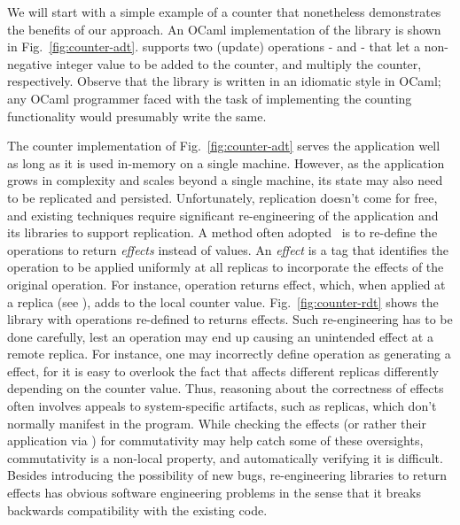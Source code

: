 We will start with a simple example of a counter that nonetheless
demonstrates the benefits of our approach. An OCaml implementation of
the  library is shown in Fig.~\ref{fig:counter-adt}.
 supports two (update) operations -  and  -
that let a non-negative integer value to be added to the counter, and
multiply the counter, respectively. Observe that the library is
written in an idiomatic style in OCaml; any OCaml programmer faced
with the task of implementing the counting functionality would
presumably write the same.

The counter implementation of Fig.~\ref{fig:counter-adt} serves the
application well as long as it is used in-memory on a single machine.
However, as the application grows in complexity and scales beyond a
single machine, its state may also need to be replicated and
persisted. Unfortunately, replication doesn't come for free, and
existing techniques require significant re-engineering of the
application and its libraries to support replication. A method often
adopted~\cite{crdts, pldi15, gotsman-popl16} is to re-define the operations to
return \emph{effects} instead of values.  An \emph{effect} is a tag that
identifies the operation to be applied uniformly at all
replicas to incorporate the effects of the original operation. For
instance,  operation returns  effect,
which, when applied at a replica (see ), adds  to the
local counter value.  Fig.~\ref{fig:counter-rdt} shows the
 library with operations re-defined to returns effects.
Such re-engineering has to be done carefully, lest an operation may
end up causing an unintended effect at a remote replica. For
instance, one may incorrectly define  operation as
generating a  effect, for it is easy to overlook the fact
that  affects different replicas differently
depending on the counter value. Thus, reasoning about the correctness
of effects often involves appeals to system-specific artifacts, such
as replicas, which don't normally manifest in the program.  While
checking the effects (or rather their application via ) for
commutativity may help catch some of these oversights, commutativity
is a non-local property, and automatically verifying it is difficult.
Besides introducing the possibility of new bugs, re-engineering
libraries to return effects has obvious software engineering problems
in the sense that it breaks backwards compatibility with the existing
code.

